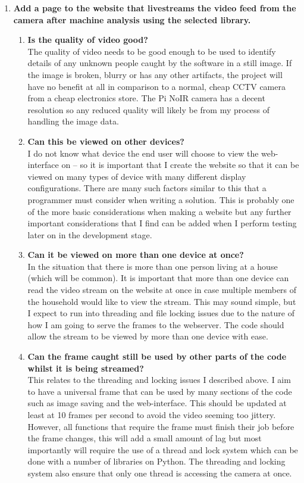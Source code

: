 \documentclass[9pt]{article}
\begin{document}
\begin{small}
\begin{enumerate}
		\item \textbf{Add a page to the website that livestreams the video feed from the camera after machine analysis using the selected library.}
		\begin{enumerate}
			\item \textbf{Is the quality of video good?}\\
				The quality of video needs to be good enough to be used to identify details of any unknown people caught by the software in a still image. If the image is broken, blurry or has any other artifacts, the project will have no benefit at all in comparison to a normal, cheap CCTV camera from a cheap electronics store. The Pi NoIR camera has a decent resolution so any reduced quality will likely be from my process of handling the image data.
			\item \textbf{Can this be viewed on other devices?}\\
				I do not know what device the end user will choose to view the web-interface on – so it is important that I create the website so that it can be viewed on many types of device with many different display configurations. There are many such factors similar to this that a programmer must consider when writing a solution. This is probably one of the more basic considerations when making a website but any further important considerations that I find can be added when I perform testing later on in the development stage.
			\item \textbf{Can it be viewed on more than one device at once?}\\
				In the situation that there is more than one person living at a house (which will be common). It is important that more than one device can read the video stream on the website at once in case multiple members of the household would like to view the stream. This may sound simple, but I expect to run into threading and file locking issues due to the nature of how I am going to serve the frames to the webserver. The code should allow the stream to be viewed by more than one device with ease.
			\item \textbf{Can the frame caught still be used by other parts of the code whilst it is being streamed?}\\
				This relates to the threading and locking issues I described above. I aim to have a universal frame that can be used by many sections of the code such as image saving and the web-interface. This should be updated at least at 10 frames per second to avoid the video seeming too jittery. However, all functions that require the frame must finish their job before the frame changes, this will add a small amount of lag but most importantly will require the use of a thread and lock system which can be done with a number of libraries on Python. The threading and locking system also ensure that only one thread is accessing the camera at once.
		\end{enumerate}
		

\end{enumerate}
\end{small}
\end{document}
